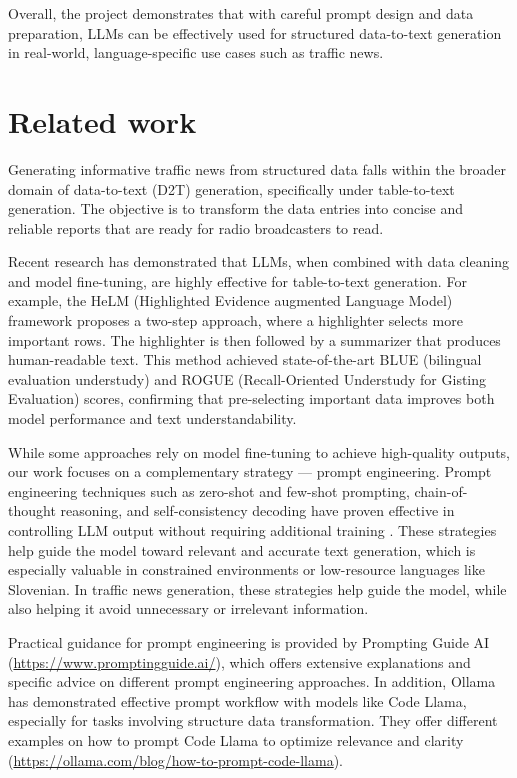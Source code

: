 \documentclass[fleqn,moreauthors,10pt]{ds_report}
\begin{document}
Overall, the project demonstrates that with careful prompt design and data preparation, LLMs can be effectively used for structured data-to-text generation in real-world, language-specific use cases such as traffic news.


\section*{Related work}
Generating informative traffic news from structured data falls within the broader domain of data-to-text (D2T) generation, specifically under table-to-text generation. The objective is to transform the data entries into concise and reliable reports that are ready for radio broadcasters to read.\newline

Recent research has demonstrated that LLMs, when combined with data cleaning and model fine-tuning, are highly effective for table-to-text generation. For example, the HeLM (Highlighted Evidence augmented Language Model) framework \cite{bian2024helmhighlightedevidenceaugmented} proposes a two-step approach, where a highlighter selects more important rows. The highlighter is then followed by a summarizer that produces human-readable text. This method achieved state-of-the-art BLUE (bilingual evaluation understudy) and ROGUE (Recall-Oriented Understudy for Gisting Evaluation) scores, confirming that pre-selecting important data improves both model performance and text understandability.\newline

While some approaches rely on model fine-tuning to achieve high-quality outputs, our work focuses on a complementary strategy — prompt engineering. Prompt engineering techniques such as zero-shot and few-shot prompting, chain-of-thought reasoning, and self-consistency decoding have proven effective in controlling LLM output without requiring additional training \cite{vatsal2024surveypromptengineeringmethods}. These strategies help guide the model toward relevant and accurate text generation, which is especially valuable in constrained environments or low-resource languages like Slovenian. In traffic news generation, these strategies help guide the model, while also helping it avoid unnecessary or irrelevant information.\newline

Practical guidance for prompt engineering is provided by Prompting Guide AI (\url{https://www.promptingguide.ai/}), which offers extensive explanations and specific advice on different prompt engineering approaches. In addition, Ollama has demonstrated effective prompt workflow with models like Code Llama, especially for tasks involving structure data transformation. They offer different examples on how to prompt Code Llama to optimize relevance and clarity (\url{https://ollama.com/blog/how-to-prompt-code-llama}).\newline
\end{document}
